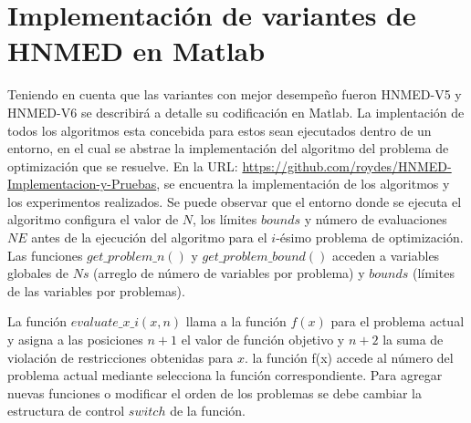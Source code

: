 
\chapter{Implementación de variantes de HNMED en Matlab} %

\label{AppendixA} %

Teniendo en cuenta que las variantes con mejor desempeño fueron HNMED-V5 y HNMED-V6 se describirá a detalle su codificación en Matlab. La implentación de todos los algoritmos esta concebida para estos sean ejecutados dentro de un entorno, en el cual se abstrae la implementación del algoritmo del problema de optimización que se resuelve. En la URL:  \url{https://github.com/roydes/HNMED-Implementacion-y-Pruebas}, se encuentra la implementación de los algoritmos y los experimentos realizados. Se puede observar que el entorno donde se ejecuta el algoritmo configura el valor de $N$, los límites $bounds$ y número de evaluaciones $NE$ antes de la ejecución del algoritmo para el $i$-ésimo problema de optimización. Las funciones $get\_problem\_n()$ y $get\_problem\_bound()$ acceden a variables globales  de $Ns$ (arreglo de número de variables por problema) y $bounds$ (límites de las variables por problemas).

 La función $evaluate\_x\_i(x,n)$ llama a la función $f(x)$ para el problema actual y asigna a las posiciones $n+1$ el valor de función objetivo y $n+2$ la suma de violación de restricciones obtenidas para  $x$. la función f(x) accede al número del problema actual mediante selecciona la función correspondiente. Para agregar nuevas funciones o modificar el orden de los problemas se debe cambiar la estructura de control $switch$ de la función.
 
